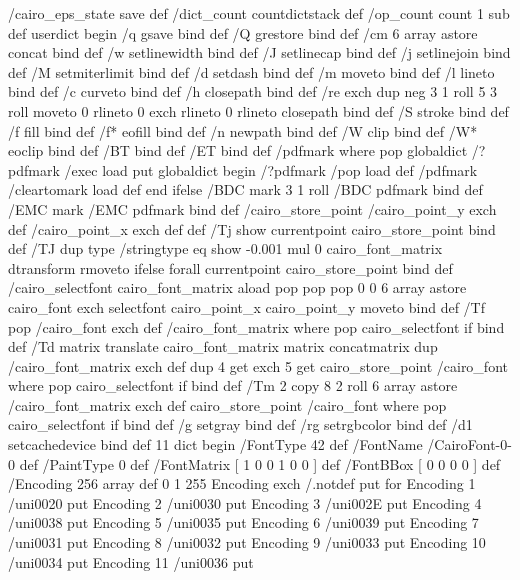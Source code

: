 /cairo_eps_state save def
/dict_count countdictstack def
/op_count count 1 sub def
userdict begin
/q { gsave } bind def
/Q { grestore } bind def
/cm { 6 array astore concat } bind def
/w { setlinewidth } bind def
/J { setlinecap } bind def
/j { setlinejoin } bind def
/M { setmiterlimit } bind def
/d { setdash } bind def
/m { moveto } bind def
/l { lineto } bind def
/c { curveto } bind def
/h { closepath } bind def
/re { exch dup neg 3 1 roll 5 3 roll moveto 0 rlineto
      0 exch rlineto 0 rlineto closepath } bind def
/S { stroke } bind def
/f { fill } bind def
/f* { eofill } bind def
/n { newpath } bind def
/W { clip } bind def
/W* { eoclip } bind def
/BT { } bind def
/ET { } bind def
/pdfmark where { pop globaldict /?pdfmark /exec load put }
    { globaldict begin /?pdfmark /pop load def /pdfmark
    /cleartomark load def end } ifelse
/BDC { mark 3 1 roll /BDC pdfmark } bind def
/EMC { mark /EMC pdfmark } bind def
/cairo_store_point { /cairo_point_y exch def /cairo_point_x exch def } def
/Tj { show currentpoint cairo_store_point } bind def
/TJ {
  {
    dup
    type /stringtype eq
    { show } { -0.001 mul 0 cairo_font_matrix dtransform rmoveto } ifelse
  } forall
  currentpoint cairo_store_point
} bind def
/cairo_selectfont { cairo_font_matrix aload pop pop pop 0 0 6 array astore
    cairo_font exch selectfont cairo_point_x cairo_point_y moveto } bind def
/Tf { pop /cairo_font exch def /cairo_font_matrix where
      { pop cairo_selectfont } if } bind def
/Td { matrix translate cairo_font_matrix matrix concatmatrix dup
      /cairo_font_matrix exch def dup 4 get exch 5 get cairo_store_point
      /cairo_font where { pop cairo_selectfont } if } bind def
/Tm { 2 copy 8 2 roll 6 array astore /cairo_font_matrix exch def
      cairo_store_point /cairo_font where { pop cairo_selectfont } if } bind def
/g { setgray } bind def
/rg { setrgbcolor } bind def
/d1 { setcachedevice } bind def
11 dict begin
/FontType 42 def
/FontName /CairoFont-0-0 def
/PaintType 0 def
/FontMatrix [ 1 0 0 1 0 0 ] def
/FontBBox [ 0 0 0 0 ] def
/Encoding 256 array def
0 1 255 { Encoding exch /.notdef put } for
Encoding 1 /uni0020 put
Encoding 2 /uni0030 put
Encoding 3 /uni002E put
Encoding 4 /uni0038 put
Encoding 5 /uni0035 put
Encoding 6 /uni0039 put
Encoding 7 /uni0031 put
Encoding 8 /uni0032 put
Encoding 9 /uni0033 put
Encoding 10 /uni0034 put
Encoding 11 /uni0036 put
